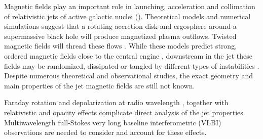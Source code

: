 \documentclass[a4paper,fleqn,usenatbib,useAMS]{mnras}
\begin{document}
Magnetic fields play an important role in launching, acceleration and collimation of relativistic jets of active galactic nuclei (\citealt{blandford_znajek_77}). 
Theoretical models and numerical simulations suggest that a rotating accretion disk and ergosphere around a supermassive black hole will produce magnetized plasma outflows. Twisted magnetic fields will thread these flows \citep[e.g.][]{meier_etal01,vlahakis_konigl_04}.
While these models predict strong, ordered magnetic fields close to the central engine \citep[e.g.][]{blandford_znajek_77,2005ApJ...625...60N}, downstream in the jet these fields may be randomized, dissipated or tangled by different types of instabilities \citep[e.g.][]{1994MNRAS.267..629I,2004ApSS.293..117H}.
Despite numerous theoretical and observational studies, the exact geometry and main properties of the jet magnetic fields are still not known.

Faraday rotation and depolarization at radio wavelength \citep[e.g.][]{1997ApJ...483L...9U,zavala_taylor_03,osullivan_gabuzda_09,hovatta_etal12,osullivan_etal12,farnes_etal14,2016A...586A.117P}, together with relativistic and opacity effects complicate direct analysis of the jet properties. 
Multiwavelength full-Stokes very long baseline interferometric (VLBI) observations are needed to consider and account for these effects.
\end{document}
